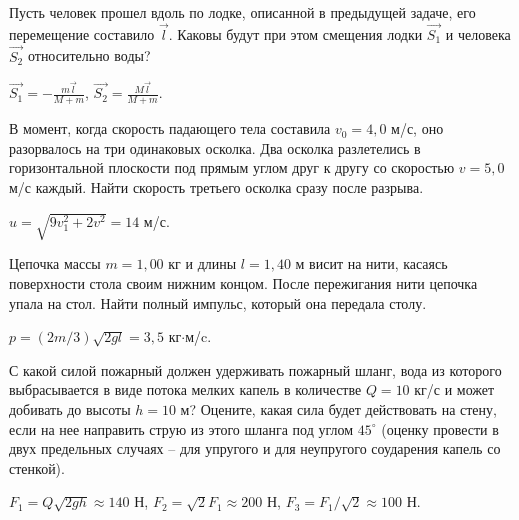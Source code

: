 \begin{ex} %
Пусть человек прошел вдоль по лодке, описанной в предыдущей задаче, его перемещение составило $\vec{l}$. Каковы будут при этом смещения лодки $\vec{S_1}$ и человека $\vec{S_2}$ относительно воды?
\begin{ans}
$\vec{S_1} = -\frac{m\vec{l}}{M+m}$, $\vec{S_2} = \frac{M\vec{l}}{M+m}$.
\end{ans}
\end{ex}

\begin{ex} %
В момент, когда скорость падающего тела составила $v_0 = 4,0$ м/с, оно разорвалось на три одинаковых осколка. Два осколка разлетелись в горизонтальной плоскости под прямым углом друг к другу со скоростью $v = 5,0$ м/с каждый. Найти скорость третьего осколка сразу после разрыва.
\begin{ans}
$u = \sqrt{9v_{1}^2 + 2v^2} = 14$ м/с.
\end{ans}
\end{ex}

\begin{ex} %
Цепочка массы $m = 1,00$ кг и длины $l = 1,40$ м висит на нити, касаясь поверхности стола своим нижним концом. После пережигания нити цепочка упала на стол. Найти полный импульс, который она передала столу.
\begin{ans}
$p = (2m/3)\sqrt{2gl} = 3,5$ кг$\cdot$м/c.
\end{ans}
\end{ex}

\begin{ex} %
С какой силой пожарный должен удерживать пожарный шланг, вода из которого выбрасывается в виде потока мелких капель в количестве $Q = 10$ кг/с и может добивать до высоты $h = 10$ м? Оцените, какая сила будет действовать на стену, если на нее направить струю из этого шланга под углом $45^{\circ}$ (оценку провести в двух предельных случаях -- для упругого и для неупругого соударения капель со стенкой).
\begin{ans}
$F_1 = Q\sqrt{2gh} \approx 140$ Н, $F_2 = \sqrt{2} F_1 \approx 200$ Н, $F_3 = F_1/\sqrt{2} \approx 100$ Н. 
\end{ans}
\end{ex}

\clearpage